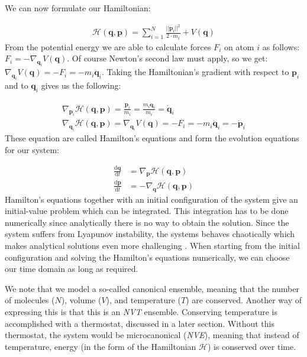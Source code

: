 \documentclass[11pt,a4paper]{article}
\begin{document}
We can now formulate our Hamiltonian:

\begin{align}
\mathcal{H}\left( \mathbf{q}, \mathbf{p}\right) = \sum\limits_{i=1}^{N} \frac{||\textbf{p}_i||^2}{2\cdot m_i} + V(\textbf{q})
\end{align}
From the potential energy we are able to calculate forces $F_i$ on atom $i$ as follows: $F_i = -\nabla_{\textbf{q}_i}V(\textbf{q})$. Of course Newton's second law must apply, so we get: $\nabla_{\textbf{q}_i}V(\textbf{q}) = -F_i = -m_i\ddot{\textbf{q}}_i$. Taking the Hamiltonian's gradient with respect to $\textbf{p}_i$ and to $\textbf{q}_i$ gives us the following:

\begin{align}
\nabla_{\textbf{p}_i} \mathcal{H}\left( \mathbf{q}, \mathbf{p}\right) = \frac{\textbf{p}_i}{m_i} = \frac{m_i \textrm{$\dot{\textbf{q}}$}_i}{m_i} = \textrm{$\dot{\textbf{q}}$}_i \\
\nabla_{\textbf{q}_i} \mathcal{H}\left( \mathbf{q}, \mathbf{p}\right) = \nabla_{\textbf{q}_i}V(\textbf{q}) = -F_i = -m_i\ddot{\textbf{q}}_i = -\dot{\textbf{p}}_i
\end{align}
These equation are called Hamilton's equations and form the evolution equations for our system:

\begin{align}
\frac{\mathrm{d}\textbf{q}}{\mathrm{d}t} &= \nabla_{\textbf{p}}\mathcal{H}\left( \mathbf{q}, \mathbf{p}\right)\\
\frac{\mathrm{d}\textbf{p}}{\mathrm{d}t} &= -\nabla_{\textbf{q}}\mathcal{H}\left( \mathbf{q}, \mathbf{p}\right)
\end{align}
Hamilton's equations together with an initial configuration of the system give an initial-value problem which can be integrated. This integration has to be done numerically since analytically there is no way to obtain the solution. Since the system suffers from Lyapunov instability, the systems behaves chaotically which makes analytical solutions even more challenging \cite{lyapunov}. When starting from the initial configuration and solving the Hamilton's equations numerically, we can choose our time domain as long as required.

We note that we model a so-called canonical ensemble, meaning that the number of molecules ($N$), volume ($V$), and temperature ($T$) are conserved. Another way of expressing this is that this is an \textit{NVT} ensemble. Conserving temperature is accomplished with a thermostat, discussed in a later section. Without this thermostat, the system would be microcanonical (\textit{NVE}), meaning that instead of temperature, energy (in the form of the Hamiltonian $\mathcal{H}$) is conserved over time. 
\end{document}
